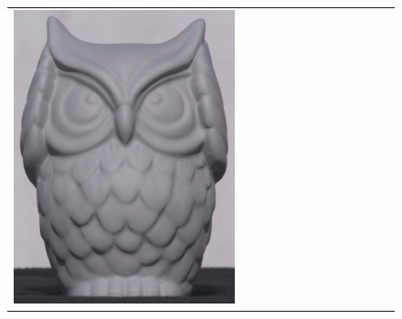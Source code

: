\begin{figure}[!ht]
\begin{tabular}{@{}rcccccccccccc@{}}
    \includegraphics[width=\customwidth]{./figures/reconstruction/object/123346.jpg} &

\end{tabular}
\end{figure}
